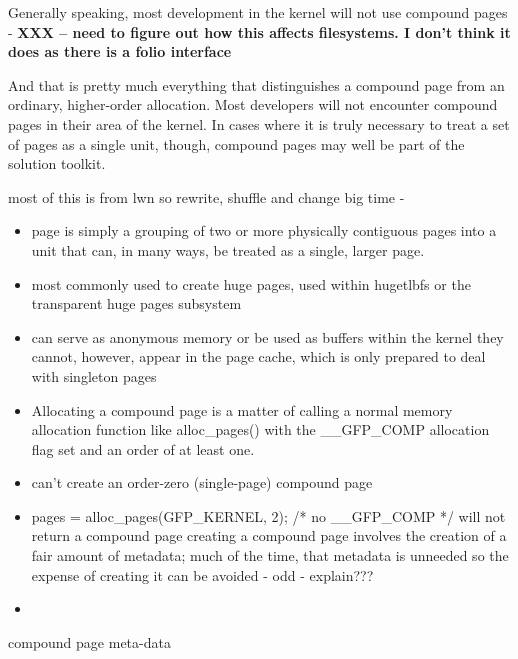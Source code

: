 Generally speaking, most development in the kernel will not use compound pages - \textbf{XXX -- need to figure out how this affects filesystems. I don't think it does as there is a folio interface}

And that is pretty much everything that distinguishes a compound page from an ordinary, higher-order allocation. Most developers will not encounter compound pages in their area of the kernel. In cases where it is truly necessary to treat a set of pages as a single unit, though, compound pages may well be part of the solution toolkit.

most of this is from lwn so rewrite, shuffle and change big time - %

\begin{itemize}
	\item page is simply a grouping of two or more physically contiguous pages into a unit that can, in many ways, be 
		treated as a single, larger page.
	\item most commonly used to create huge pages, used within hugetlbfs or the transparent huge pages subsystem
	\item can serve as anonymous memory or be used as buffers within the kernel
		\subitem they cannot, however, appear in the page cache, which is only prepared to deal with singleton pages
	\item Allocating a compound page is a matter of calling a normal memory allocation function like alloc\_pages() 
		with the \_\_GFP\_COMP allocation flag set and an order of at least one.
	\item can't create an order-zero (single-page) compound page
	\item pages = alloc\_pages(GFP\_KERNEL, 2);  /* no \_\_GFP\_COMP */ will not return a compound page 
		creating a compound page involves the creation of a fair amount of metadata; much of the time, that metadata
		 is unneeded so the expense of creating it can be avoided - odd - explain???
	\item 
\end{itemize}

\noindent
compound page meta-data

